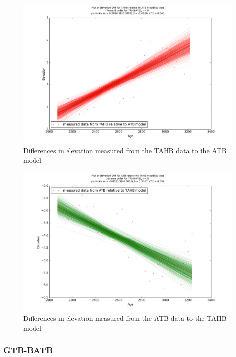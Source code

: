 \begin{figure}[h]
	\includegraphics[width=0.9\linewidth]{data/bothNonZero/withinSeventyFivePercent/gias/theGIA_TAHB_relative_to_ATB.png}
	\caption{Differences in elevation measured from the TAHB data to the ATB model}
	\label{fig:gias_TAHBxATB}
\end{figure}
\newpage


\begin{figure}[h]
	\includegraphics[width=0.9\linewidth]{data/bothNonZero/withinSeventyFivePercent/gias/theGIA_ATB_relative_to_TAHB.png}
	\caption{Differences in elevation measured from the ATB data to the TAHB model}
	\label{fig:gias_ATBxTAHB}
\end{figure}
\newpage




\subsubsection{GTB-BATB}

